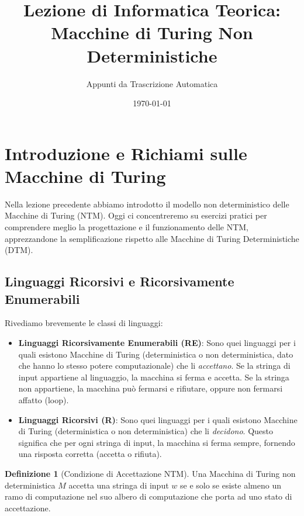 \documentclass[a4paper]{article}
\title{Lezione di Informatica Teorica: Macchine di Turing Non Deterministiche}
\author{Appunti da Trascrizione Automatica}
\date{\today}
\theoremstyle{definition} %
\newtheorem{definition}{Definizione}[section]
\begin{document}

\maketitle
\tableofcontents
\newpage

\section{Introduzione e Richiami sulle Macchine di Turing}

Nella lezione precedente abbiamo introdotto il modello non deterministico delle Macchine di Turing (NTM). Oggi ci concentreremo su esercizi pratici per comprendere meglio la progettazione e il funzionamento delle NTM, apprezzandone la semplificazione rispetto alle Macchine di Turing Deterministiche (DTM).

\subsection{Linguaggi Ricorsivi e Ricorsivamente Enumerabili}

Rivediamo brevemente le classi di linguaggi:
\begin{itemize}
    \item \textbf{Linguaggi Ricorsivamente Enumerabili (RE)}: Sono quei linguaggi per i quali esistono Macchine di Turing (deterministica o non deterministica, dato che hanno lo stesso potere computazionale) che li \emph{accettano}. Se la stringa di input appartiene al linguaggio, la macchina si ferma e accetta. Se la stringa non appartiene, la macchina può fermarsi e rifiutare, oppure non fermarsi affatto (loop).
    \item \textbf{Linguaggi Ricorsivi (R)}: Sono quei linguaggi per i quali esistono Macchine di Turing (deterministica o non deterministica) che li \emph{decidono}. Questo significa che per ogni stringa di input, la macchina si ferma sempre, fornendo una risposta corretta (accetta o rifiuta).
\end{itemize}

\begin{definition}[Condizione di Accettazione NTM]
Una Macchina di Turing non deterministica $M$ accetta una stringa di input $w$ se e solo se esiste almeno un ramo di computazione nel suo albero di computazione che porta ad uno stato di accettazione.
\end{definition}
\end{document}
